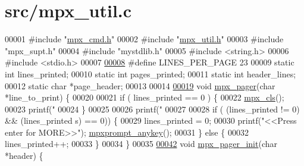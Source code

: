 \hypertarget{mpx__util_8c_source}{
\section{src/mpx\_\-util.c}
}

\begin{DoxyCode}
00001 \textcolor{preprocessor}{#include "\hyperlink{mpx__cmd_8h}{mpx_cmd.h}"}
00002 \textcolor{preprocessor}{#include "\hyperlink{mpx__util_8h}{mpx_util.h}"}
00003 \textcolor{preprocessor}{#include "mpx\_supt.h"}
00004 \textcolor{preprocessor}{#include "mystdlib.h"}
00005 \textcolor{preprocessor}{#include <string.h>}
00006 \textcolor{preprocessor}{#include <stdio.h>}
00007 
\hypertarget{mpx__util_8c_source_l00008}{}\hyperlink{mpx__util_8c_a12524c7edee3a47c783740982fd01a3f}{00008} \textcolor{preprocessor}{#define LINES\_PER\_PAGE 23}
00009 \textcolor{preprocessor}{}\textcolor{keyword}{static} \textcolor{keywordtype}{int} lines\_printed;
00010 \textcolor{keyword}{static} \textcolor{keywordtype}{int} pages\_printed;
00011 \textcolor{keyword}{static} \textcolor{keywordtype}{int} header\_lines;
00012 \textcolor{keyword}{static} \textcolor{keywordtype}{char} *page\_header;
00013 
00014 
\hypertarget{mpx__util_8c_source_l00019}{}\hyperlink{mpx__util_8h_a9e59881f10bd91d7255f18f205e101e6}{00019} \textcolor{keywordtype}{void} \hyperlink{mpx__util_8c_a9e59881f10bd91d7255f18f205e101e6}{mpx_pager}(\textcolor{keywordtype}{char} *line\_to\_print) \{
00020 
00021         \textcolor{keywordflow}{if} ( lines\_printed == 0 ) \{
00022                 \hyperlink{mpx__util_8c_a8cf3281978ba1652fd5d643e1a41f70b}{mpx_cls}();
00023                 printf(\textcolor{stringliteral}{"%
00024         \}
00025         
00026         printf(\textcolor{stringliteral}{"%
00027 
00028         \textcolor{keywordflow}{if} ( (lines\_printed != 0) && (lines\_printed %
      s) == 0)) \{
00029                 lines\_printed = 0;
00030                 printf(\textcolor{stringliteral}{"<<Press enter for MORE>>"}); \hyperlink{mpx__util_8c_a338d01dfe3c80732c00450203c85b964}{mpxprompt_anykey}();
00031         \} \textcolor{keywordflow}{else} \{
00032                 lines\_printed++;
00033         \}
00034 \}
00035 
\hypertarget{mpx__util_8c_source_l00042}{}\hyperlink{mpx__util_8h_a60afdb7496b6ff469c6b98d2ecde15ed}{00042} \textcolor{keywordtype}{void} \hyperlink{mpx__util_8c_a60afdb7496b6ff469c6b98d2ecde15ed}{mpx_pager_init}(\textcolor{keywordtype}{char} *header) \{
}}
\end{DoxyCode}
